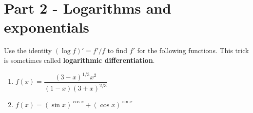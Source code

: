 \documentclass[9pt, a4paper, oneside, reqno]{amsart}
\begin{document}
\section*{Part 2 - Logarithms and exponentials}
\begin{questions}[resume]
	\item Use the identity $ (\log f)' = f' / f$ to find $ f'$ for the following functions. This trick is sometimes called \textbf{logarithmic differentiation}.
	\begin{multicols}{2}
		\begin{enumerate}
			\item $ f(x) = \dfrac{(3-x)^{1/3}x^2}{(1-x)(3+x)^{2/3}}$
			\item $ f(x) = (\sin x)^{\cos x} + (\cos x)^{\sin x}$
		\end{enumerate}
	\end{multicols}


\end{questions}
\end{document}
